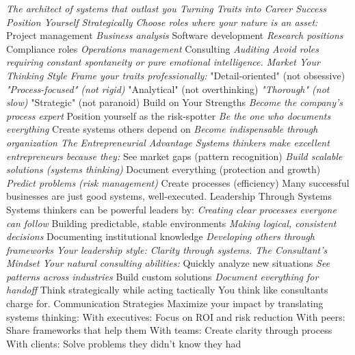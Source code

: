 \documentclass[12pt]{book}
\begin{document}
\textit{ The architect of systems that outlast you
Turning Traits into Career Success
Position Yourself Strategically Choose roles where your nature is an asset:
} Project management
\textit{ Business analysis
} Software development
\textit{ Research positions
} Compliance roles
\textit{ Operations management
} Consulting
\textit{ Auditing
Avoid roles requiring constant spontaneity or pure emotional intelligence.
Market Your Thinking Style Frame your traits professionally:
} "Detail-oriented" (not obsessive)
\textit{ "Process-focused" (not rigid)
} "Analytical" (not overthinking)
\textit{ "Thorough" (not slow)
} "Strategic" (not paranoid)
Build on Your Strengths
\textit{ Become the company's process expert
} Position yourself as the risk-spotter
\textit{ Be the one who documents everything
} Create systems others depend on
\textit{ Become indispensable through organization
The Entrepreneurial Advantage
Systems thinkers make excellent entrepreneurs because they:
} See market gaps (pattern recognition)
\textit{ Build scalable solutions (systems thinking)
} Document everything (protection and growth)
\textit{ Predict problems (risk management)
} Create processes (efficiency)
Many successful businesses are just good systems, well-executed.
Leadership Through Systems
Systems thinkers can be powerful leaders by:
\textit{ Creating clear processes everyone can follow
} Building predictable, stable environments
\textit{ Making logical, consistent decisions
} Documenting institutional knowledge
\textit{ Developing others through frameworks
Your leadership style: Clarity through systems.
The Consultant's Mindset
Your natural consulting abilities:
} Quickly analyze new situations
\textit{ See patterns across industries
} Build custom solutions
\textit{ Document everything for handoff
} Think strategically while acting tactically
You think like consultants charge for.
Communication Strategies
Maximize your impact by translating systems thinking:
With executives: Focus on ROI and risk reduction 
With peers: Share frameworks that help them With teams: Create clarity through process 
With clients: Solve problems they didn't know they had
\end{document}
